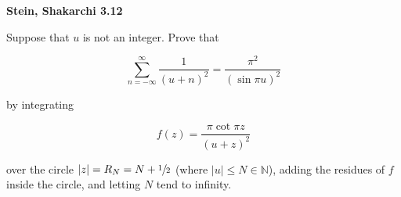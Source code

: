 \textbf{Stein, Shakarchi 3.12}

Suppose that $u$ is not an integer. Prove that

$$
\sum\limits_{n = -\infty}^{\infty} \frac{1}{(u + n)^2} = \frac{\pi^2}{(\sin{\pi u})^2}
$$

by integrating

$$
f(z) = \frac{\pi \cot{\pi z}}{(u + z)^2}
$$

over the circle $|z| = R_N = N + \sfrac{1}{2}$ (where $|u| \le N \in \mathbb{N}$), adding the residues of $f$ inside the 
circle, and letting $N$ tend to infinity.

\begin{solution}
  \ \\
\end{solution}